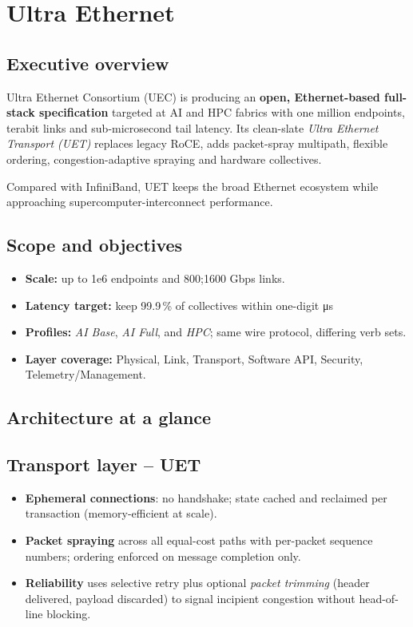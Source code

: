 \section{Ultra Ethernet}


\subsection{Executive overview}
Ultra Ethernet Consortium (UEC) is producing an \textbf{open, Ethernet-based full-stack
specification} targeted at AI and HPC fabrics with one million endpoints,
terabit links and sub-microsecond tail latency.
Its clean-slate \emph{Ultra Ethernet Transport (UET)} replaces legacy RoCE,
adds packet-spray multipath, flexible ordering, congestion-adaptive spraying
and hardware collectives.

Compared with InfiniBand, UET keeps the broad Ethernet ecosystem while
approaching supercomputer-interconnect performance.

\subsection{Scope and objectives}
\begin{itemize}
  \item \textbf{Scale:} up to 1e6 endpoints and 800;1600 Gbps links.
  \item \textbf{Latency target:} keep 99.9\,\% of collectives within one-digit
        \si{\micro\second}
  \item \textbf{Profiles:} \emph{AI Base}, \emph{AI Full}, and \emph{HPC}; same wire
        protocol, differing verb sets.
  \item \textbf{Layer coverage:} Physical, Link, Transport, Software API,
        Security, Telemetry/Management.
\end{itemize}

\subsection{Architecture at a glance}

\subsection*{Transport layer – UET}
\begin{itemize}
  \item \textbf{Ephemeral connections}: no handshake; state cached and
        reclaimed per transaction (memory-efficient at scale).
  \item \textbf{Packet spraying} across all equal-cost paths with per-packet
        sequence numbers; ordering enforced on message completion only.
  \item \textbf{Reliability} uses selective retry plus optional
        \emph{packet trimming} (header delivered, payload discarded)
        to signal incipient congestion without head-of-line
        blocking.
\end{itemize}

